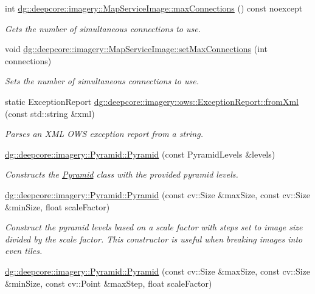 \begin{DoxyCompactItemize}
int \hyperlink{group___imagery_module_ga1774c7d4c06c8e18a98db65b088b19b9}{dg\+::deepcore\+::imagery\+::\+Map\+Service\+Image\+::max\+Connections} () const noexcept
\begin{DoxyCompactList}\small\item\em Gets the number of simultaneous connections to use. \end{DoxyCompactList}\item 
void \hyperlink{group___imagery_module_gacdb5a20006863ccb0f9601362e635df9}{dg\+::deepcore\+::imagery\+::\+Map\+Service\+Image\+::set\+Max\+Connections} (int connections)
\begin{DoxyCompactList}\small\item\em Sets the number of simultaneous connections to use. \end{DoxyCompactList}\item 
static Exception\+Report \hyperlink{group___imagery_module_ga7b82aed41808b9bebc202721d9a5adce}{dg\+::deepcore\+::imagery\+::ows\+::\+Exception\+Report\+::from\+Xml} (const std\+::string \&xml)
\begin{DoxyCompactList}\small\item\em Parses an X\+ML O\+WS exception report from a string. \end{DoxyCompactList}\item 
\hyperlink{group___imagery_module_ga5133c51d0c8c7ca698287d5d4dd61986}{dg\+::deepcore\+::imagery\+::\+Pyramid\+::\+Pyramid} (const Pyramid\+Levels \&levels)
\begin{DoxyCompactList}\small\item\em Constructs the \hyperlink{classdg_1_1deepcore_1_1imagery_1_1_pyramid}{Pyramid} class with the provided pyramid levels. \end{DoxyCompactList}\item 
\hyperlink{group___imagery_module_ga0d97d66a5c60146ee198f282e3633778}{dg\+::deepcore\+::imagery\+::\+Pyramid\+::\+Pyramid} (const cv\+::\+Size \&max\+Size, const cv\+::\+Size \&min\+Size, float scale\+Factor)
\begin{DoxyCompactList}\small\item\em Construct the pyramid levels based on a scale factor with steps set to image size divided by the scale factor. This constructor is useful when breaking images into even tiles. \end{DoxyCompactList}\item 
\hyperlink{group___imagery_module_ga92c5dda62793cc05a2fe10b8c85c7e65}{dg\+::deepcore\+::imagery\+::\+Pyramid\+::\+Pyramid} (const cv\+::\+Size \&max\+Size, const cv\+::\+Size \&min\+Size, const cv\+::\+Point \&max\+Step, float scale\+Factor)

\end{DoxyCompactItemize}
